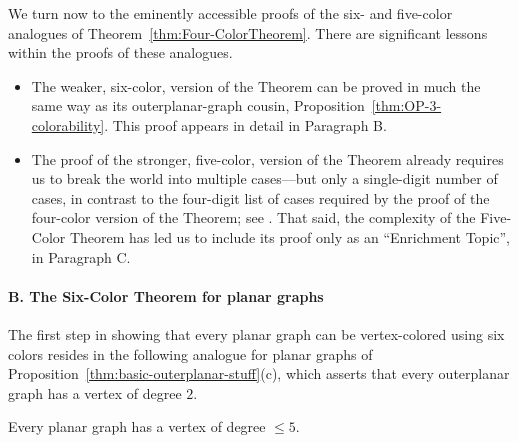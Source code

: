 \bigskip

We turn now to the eminently accessible proofs of the six- and five-color analogues of Theorem~\ref{thm:Four-ColorTheorem}.  There are significant lessons within the proofs of these 
analogues.
\begin{itemize}
\item
The weaker, six-color, version of the Theorem can be proved in much the same way as its
outerplanar-graph cousin, Proposition~\ref{thm:OP-3-colorability}.  This proof appears in detail in Paragraph B.  
\medskip\item
The proof of the stronger, five-color, version of the Theorem already requires us to break the world into multiple cases---but only a single-digit number of cases, in contrast to the four-digit list of cases required by the proof of the four-color version of the Theorem; see \cite{AppelH77a,AppelH77b}.  That said, the complexity of the Five-Color Theorem has led us to include its proof only as an ``Enrichment Topic'', in Paragraph C.
\end{itemize}


\paragraph {B. The Six-Color Theorem for planar graphs}

The first step in showing that every planar graph can be vertex-colored using six colors resides in the following analogue for planar graphs of Proposition~\ref{thm:basic-outerplanar-stuff}(c), which asserts that every outerplanar graph has a vertex of degree $2$.

\begin{lemma}
\label{thm:PlanarGraph-degree5}
Every planar graph has a vertex of degree $\leq 5$.
\end{lemma}

  

